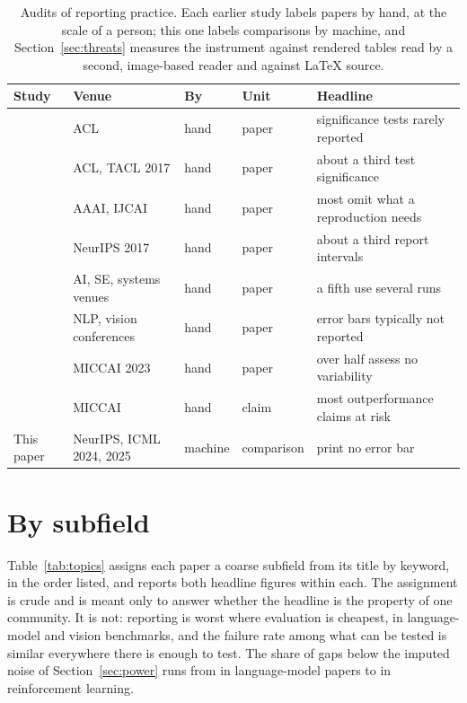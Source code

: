 \documentclass{article}
\begin{document}
\begin{table}[t]
\centering
\caption{Audits of reporting practice. Each earlier study labels papers by
hand, at the scale of a person; this one labels comparisons by machine, and
Section~\ref{sec:threats} measures the instrument against rendered tables read
by a second, image-based reader and against LaTeX source.}
\label{tab:audits}
\footnotesize
\setlength{\tabcolsep}{3pt}
\begin{tabular}{@{}p{4.1cm}p{2.2cm}p{1.1cm}p{1.6cm}p{3.1cm}@{}}
\toprule
Study & Venue & By & Unit & Headline \\
\midrule
\citet{bergkirkpatrick2012empirical} & ACL & hand & paper & significance tests rarely reported \\
\citet{dror2018hitchhiker} & ACL, TACL 2017 & hand & paper & about a third test significance \\
\citet{gundersen2018state} & AAAI, IJCAI & hand & paper & most omit what a reproduction needs \\
\citet{kirly2018nips} & NeurIPS 2017 & hand & paper & about a third report intervals \\
\citet{pham2020problems} & AI, SE, systems venues & hand & paper & a fifth use several runs \\
\citet{hutchinson2022evaluation} & NLP, vision conferences & hand & paper & error bars typically not reported \\
\citet{christodoulou2024confidence} & MICCAI 2023 & hand & paper & over half assess no variability \\
\citet{christodoulou2025false} & MICCAI & hand & claim & most outperformance claims at risk \\
This paper & NeurIPS, ICML 2024, 2025 & machine & comparison & \nPctNeitherSide{} print no error bar \\
\bottomrule
\end{tabular}
\end{table}

\section{By subfield}
\label{app:topics}

Table~\ref{tab:topics} assigns each paper a coarse subfield from its title by
keyword, in the order listed, and reports both headline figures within each.
The assignment is crude and is meant only to answer whether the headline is
the property of one community. It is not: reporting is worst where evaluation
is cheapest, in language-model and vision benchmarks, and the failure rate
among what can be tested is similar everywhere there is enough to test. The share of gaps below
the imputed noise of Section~\ref{sec:power} runs from \nDesignLmBelow{} in
language-model papers to \nDesignRlBelow{} in reinforcement learning.
\end{document}

